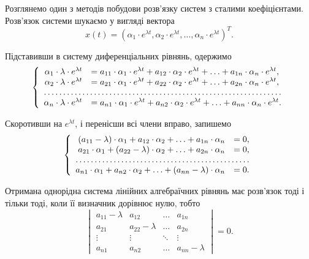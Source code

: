 Розглянемо один з методів побудови розв’язку систем з сталими коефіцієнтами. \\

Розв’язок системи шукаємо у вигляді вектора \[x(t) = (\alpha_1 \cdot e^{\lambda t}, \alpha_2 \cdot e^{\lambda t}, \ldots, \alpha_n \cdot e^{\lambda t})^T. \]

Підставивши в систему диференціальних рівнянь, одержимо
\begin{equation*}
	\left\{
		\begin{array}{rl}
			\alpha_1 \cdot \lambda \cdot e^{\lambda t} &= a_{11} \cdot \alpha_1 \cdot e^{\lambda t} + a_{12} \cdot \alpha_2  \cdot e^{\lambda t} + \ldots + a_{1n} \cdot \alpha_n \cdot e^{\lambda t}, \\
			\alpha_2 \cdot \lambda \cdot e^{\lambda t} &= a_{21} \cdot \alpha_1 \cdot e^{\lambda t} + a_{22} \cdot \alpha_2 \cdot e^{\lambda t} + \ldots + a_{2n} \cdot \alpha_n \cdot e^{\lambda t}, \\
			\hdotsfor{2} \\
			\alpha_n \cdot \lambda \cdot e^{\lambda t} &= a_{n1} \cdot \alpha_1 \cdot e^{\lambda t} + a_{n2} \cdot \alpha_2 \cdot e^{\lambda t} + \ldots + a_{nn} \cdot \alpha_n \cdot e^{\lambda t}.
		\end{array}
	\right.
\end{equation*}
 
Скоротивши на $e^{\lambda t}$, і перенісши всі члени вправо, запишемо
\begin{equation*}
	\left\{
		\begin{array}{rl}
			(a_{11} - \lambda) \cdot \alpha_1 + a_{12} \cdot \alpha_2 + \ldots + a_{1n} \cdot \alpha_n &= 0, \\
			a_{21} \cdot \alpha_1 + (a_{22} - \lambda) \cdot \alpha_2 + \ldots + a_{2n} \cdot \alpha_n &= 0, \\
			\hdotsfor{2} \\
			a_{n1} \cdot \alpha_1 + a_{n2} \cdot \alpha_2 + \ldots + (a_{nn} - \lambda) \cdot \alpha_n &= 0.
		\end{array}
	\right.
\end{equation*}
 
Отримана однорідна система лінійних алгебраїчних рівнянь має розв’язок тоді і тільки тоді, коли її визначник дорівнює нулю, тобто
\begin{equation*}
	\begin{vmatrix}
		a_{11} - \lambda & a_{12} & \ldots & a_{1n} \\
		a_{21} & a_{22} - \lambda & \ldots & a_{2n} \\
		\vdots & \vdots & \ddots & \vdots \\
		a_{n1} & a_{n2} & \ldots & a_{nn} - \lambda
	\end{vmatrix} = 0.
\end{equation*}

